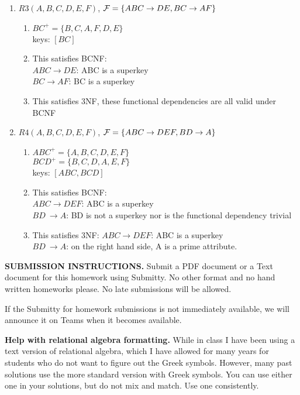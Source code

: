 \documentclass[11pt]{article}
\begin{document}
\begin{enumerate}
\item $R3(A,B,C,D,E,F)$, ${\cal F} = \{ABC\rightarrow DE, BC\rightarrow AF \}$
    \begin{enumerate}[label=\Alph*]
    \item $BC^+ = \{B,C,A,F,D,E\}$ \\
    keys: $[BC]$
    \item This satisfies BCNF:\\
    $ABC \rightarrow DE$: ABC is a superkey \\
    $BC \rightarrow AF$: BC is a superkey
    \item This satisfies 3NF, these functional dependencies are all valid under BCNF
    \end{enumerate}
\item $R4(A,B,C,D,E,F)$, ${\cal F} = \{ABC\rightarrow DEF, BD\rightarrow A \}$
    \begin{enumerate}[label=\Alph*]
    \item $ABC^+ = \{A,B,C,D,E,F\}$ \\
    $BCD^+ = \{B,C,D,A,E,F\}$ \\
    keys: $[ABC, BCD]$
    \item This satisfies BCNF:\\
    $ABC \rightarrow DEF$: ABC is a superkey \\
    $BD\ \rightarrow A$: BD is not a superkey nor is the functional dependency trivial
    \item This satisfies 3NF:
    $ABC \rightarrow DEF$: ABC is a superkey \\
    $BD\ \rightarrow A$: on the right hand side, A is a prime attribute.
    \end{enumerate}
\end{enumerate}


{\bf SUBMISSION INSTRUCTIONS.} Submit a PDF document or a Text
document for this homework using Submitty. No other format and no hand
written homeworks please. No late submissions will be allowed.

If the Submitty for homework submissions is not immediately available,
we will announce it on Teams when it becomes available.

{\bf Help with relational algebra formatting.} While in class I have
been using a text version of relational algebra, which I have allowed
for many years for students who do not want to figure out the Greek
symbols. However, many past solutions use the more standard version
with Greek symbols. You can use either one in your solutions, but do
not mix and match. Use one consistently.
\end{document}
